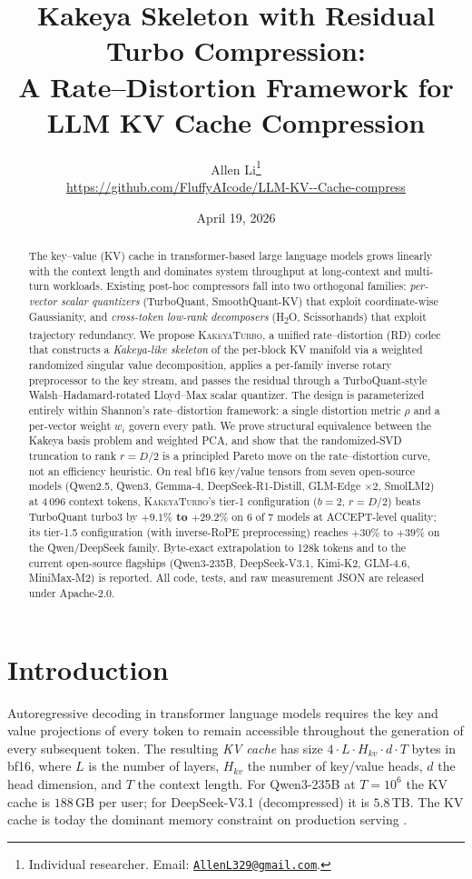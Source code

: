 \documentclass[11pt,a4paper]{article}
\title{\textbf{Kakeya Skeleton with Residual Turbo Compression:}\\
  \textbf{A Rate--Distortion Framework for LLM KV Cache Compression}}
\author{Allen Li\thanks{Individual researcher. Email: \href{mailto:AllenL329@gmail.com}{\texttt{AllenL329@gmail.com}}.}\\[2pt]
 \small \url{https://github.com/FluffyAIcode/LLM-KV--Cache-compress}}
\date{April 19, 2026}
\theoremstyle{definition}
\theoremstyle{plain}
\begin{document}
\maketitle

\begin{abstract}
The key--value (KV) cache in transformer-based large language models grows linearly with the context length and dominates system throughput at long-context and multi-turn workloads. Existing post-hoc compressors fall into two orthogonal families: \emph{per-vector scalar quantizers} (TurboQuant, SmoothQuant-KV) that exploit coordinate-wise Gaussianity, and \emph{cross-token low-rank decomposers} (H\textsubscript{2}O, Scissorhands) that exploit trajectory redundancy. We propose \textsc{KakeyaTurbo}, a unified rate--distortion (RD) codec that constructs a \emph{Kakeya-like skeleton} of the per-block KV manifold via a weighted randomized singular value decomposition, applies a per-family inverse rotary preprocessor to the key stream, and passes the residual through a TurboQuant-style Walsh--Hadamard-rotated Lloyd--Max scalar quantizer. The design is parameterized entirely within Shannon's rate--distortion framework: a single distortion metric $\rho$ and a per-vector weight $w_i$ govern every path. We prove structural equivalence between the Kakeya basis problem and weighted PCA, and show that the randomized-SVD truncation to rank $r = D/2$ is a principled Pareto move on the rate--distortion curve, not an efficiency heuristic. On real bf16 key/value tensors from seven open-source models (Qwen2.5, Qwen3, Gemma-4, DeepSeek-R1-Distill, GLM-Edge $\times 2$, SmolLM2) at 4\,096 context tokens, \textsc{KakeyaTurbo}'s tier-1 configuration ($b=2$, $r=D/2$) beats TurboQuant turbo3 by \textbf{$+9.1\%$ to $+29.2\%$} on 6 of 7 models at ACCEPT-level quality; its tier-1.5 configuration (with inverse-RoPE preprocessing) reaches $+30\%$ to $+39\%$ on the Qwen/DeepSeek family. Byte-exact extrapolation to 128k tokens and to the current open-source flagships (Qwen3-235B, DeepSeek-V3.1, Kimi-K2, GLM-4.6, MiniMax-M2) is reported. All code, tests, and raw measurement JSON are released under Apache-2.0.
\end{abstract}

\section{Introduction}
\label{sec:intro}

Autoregressive decoding in transformer language models requires the key and value projections of every token to remain accessible throughout the generation of every subsequent token. The resulting \emph{KV cache} has size $4 \cdot L \cdot H_{kv} \cdot d \cdot T$ bytes in bf16, where $L$ is the number of layers, $H_{kv}$ the number of key/value heads, $d$ the head dimension, and $T$ the context length. For Qwen3-235B at $T = 10^6$ the KV cache is $188$\,GB per user; for DeepSeek-V3.1 (decompressed) it is $5.8$\,TB. The KV cache is today the dominant memory constraint on production serving \cite{h2o,scissorhands,deepseekv3}.
\end{document}
